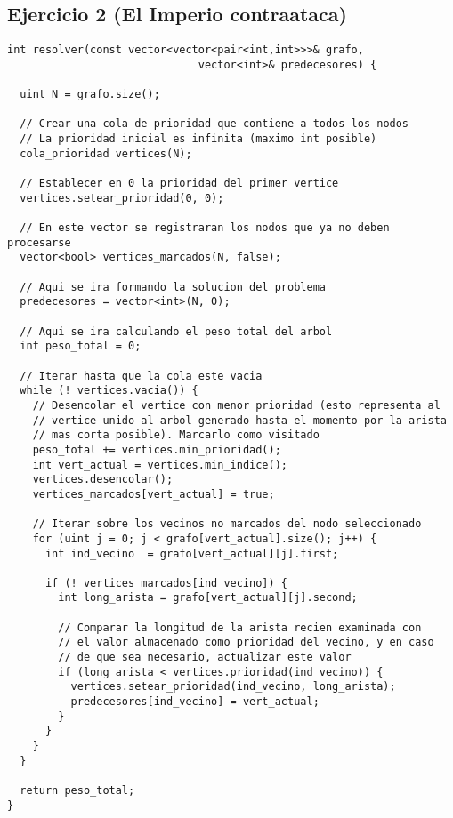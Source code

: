 \subsection{Ejercicio 2 (El Imperio contraataca)}
\begin{lstlisting}
int resolver(const vector<vector<pair<int,int>>>& grafo, 
                              vector<int>& predecesores) {

  uint N = grafo.size();

  // Crear una cola de prioridad que contiene a todos los nodos
  // La prioridad inicial es infinita (maximo int posible)
  cola_prioridad vertices(N);

  // Establecer en 0 la prioridad del primer vertice
  vertices.setear_prioridad(0, 0);

  // En este vector se registraran los nodos que ya no deben procesarse
  vector<bool> vertices_marcados(N, false);

  // Aqui se ira formando la solucion del problema
  predecesores = vector<int>(N, 0);

  // Aqui se ira calculando el peso total del arbol
  int peso_total = 0;

  // Iterar hasta que la cola este vacia
  while (! vertices.vacia()) {
    // Desencolar el vertice con menor prioridad (esto representa al
    // vertice unido al arbol generado hasta el momento por la arista
    // mas corta posible). Marcarlo como visitado
    peso_total += vertices.min_prioridad();
    int vert_actual = vertices.min_indice();
    vertices.desencolar();
    vertices_marcados[vert_actual] = true;

    // Iterar sobre los vecinos no marcados del nodo seleccionado
    for (uint j = 0; j < grafo[vert_actual].size(); j++) {
      int ind_vecino  = grafo[vert_actual][j].first;

      if (! vertices_marcados[ind_vecino]) {
        int long_arista = grafo[vert_actual][j].second;

        // Comparar la longitud de la arista recien examinada con
        // el valor almacenado como prioridad del vecino, y en caso
        // de que sea necesario, actualizar este valor
        if (long_arista < vertices.prioridad(ind_vecino)) {
          vertices.setear_prioridad(ind_vecino, long_arista);
          predecesores[ind_vecino] = vert_actual;
        }
      }
    }
  }

  return peso_total;
}
\end{lstlisting}

